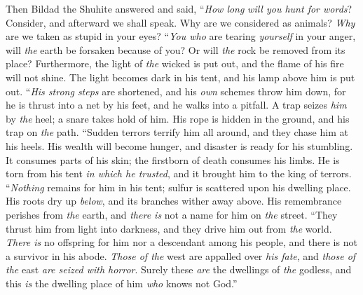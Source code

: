 \begin{biblechapter} %
 Then Bildad the Shuhite answered and said,
\verse “\textit{How long} \textit{will you hunt for words}? 
Consider, and afterward we shall speak.
\verse Why are we considered as animals? 
\textit{Why} are we taken as stupid in your eyes?
\verse “\textit{You who} are tearing \textit{yourself} in your anger, 
will \textit{the} earth be forsaken because of you? 
Or will \textit{the} rock be removed from its place?
\verse Furthermore, the light of \textit{the} wicked is put out, 
and the flame of his fire will not shine.
\verse The light becomes dark in his tent, 
and his lamp above him is put out.
\verse “\textit{His strong steps} are shortened, 
and his \textit{own} schemes throw him down,
\verse for he is thrust into a net by his feet, 
and he walks into a pitfall.
\verse A trap seizes \textit{him} by \textit{the} heel; 
a snare takes hold of him.
\verse His rope is hidden in the ground, 
and his trap on \textit{the} path.
\verse “Sudden terrors terrify him all around, 
and they chase him at his heels.
\verse His wealth will become hunger, 
and disaster is ready for his stumbling.
\verse It consumes parts of his skin; 
the firstborn of death consumes his limbs.
\verse He is torn from his tent \textit{in which he trusted}, 
and it brought him to the king of terrors.
\verse “\textit{Nothing} remains for him in his tent; 
sulfur is scattered upon his dwelling place.
\verse His roots dry up \textit{below}, 
and its branches wither away above.
\verse His remembrance perishes from \textit{the} earth, 
and \textit{there is} not a name for him on \textit{the} street.
\verse “They thrust him from light into darkness, 
and they drive him out from \textit{the} world.
\verse \textit{There is} no offspring for him nor a descendant among his people, 
and there is not a survivor in his abode.
\verse \textit{Those of the} west are appalled over \textit{his fate}, 
and \textit{those of the} east \textit{are seized with horror}.
\verse Surely these \textit{are} the dwellings of \textit{the} godless, 
and this \textit{is} the dwelling place of him \textit{who} knows not God.”
\end{biblechapter}

